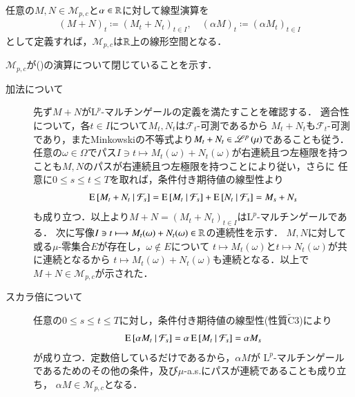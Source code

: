 	\begin{screen}
		\begin{lem}\mbox{}\\
			任意の$M,N \in \mathcal{M}_{p,c}$と$\alpha \in \mathbb{R}$に対して線型演算を
			\begin{align}
				(M + N)_t \coloneqq (M_t + N_t)_{t \in I}, 
				\quad (\alpha M)_t \coloneqq (\alpha M_t)_{t \in I}
				\label{eq:mart_linear_arithmetic_0}
			\end{align}
			として定義すれば，$\mathcal{M}_{p,c}$は$\mathbb{R}$上の線形空間となる．
		\end{lem}
	\end{screen}
	
	
	\begin{prf}
		$\mathcal{M}_{p,c}$が()の演算について閉じていることを示す．
		\begin{description}
			\item[加法について]
				先ず$M+N$が$\mathrm{L}^p$-マルチンゲールの定義を満たすことを確認する．
				適合性について，各$t \in I$について$M_t,N_t$は$\mathcal{F}_t$-可測であるから
				$M_t + N_t$も$\mathcal{F}_t$-可測であり，またMinkowskiの不等式より$M_t + N_t \in \mathscr{L}^{p} \left(\mu\right)$であることも従う．
				任意の$\omega \in \Omega$でパス$I \ni t \longmapsto M_t(\omega) + N_t(\omega)$が右連続且つ左極限を持つ
				ことも$M,N$のパスが右連続且つ左極限を持つことにより従い，さらに
				任意に$0 \leq s \leq t \leq T$を取れば，条件付き期待値の線型性より
				\begin{align}
					\operatorname{E} \left[ M_t + N_t \ \middle|\ \mathcal{F}_s \right] = \operatorname{E} \left[ M_t \ \middle|\ \mathcal{F}_s \right] + \operatorname{E} \left[ N_t \ \middle|\ \mathcal{F}_s \right] = M_s + N_s
				\end{align}
				も成り立つ．以上より$M+N = (M_t + N_t)_{t \in I}$は$\mathrm{L}^p$-マルチンゲールである．
				次に写像$I \ni t \longmapsto M_t(\omega) + N_t(\omega) \in \mathbb{R}$の連続性を示す．
				$M,N$に対して或る$\mu$-零集合$E$が存在し，$\omega \notin E$について
				$t \longmapsto M_t(\omega)$と$t \longmapsto N_t(\omega)$が共に連続となるから
				$t \longmapsto M_t(\omega) + N_t(\omega)$も連続となる．以上で$M+N \in \mathcal{M}_{p,c}$が示された．
			
			\item[スカラ倍について]
				任意の$0 \leq s \leq t \leq T$に対し，条件付き期待値の線型性(性質$\tilde{\mathrm{C}}3$)により
				\begin{align}
					\operatorname{E} \left[ \alpha M_t \ \middle|\ \mathcal{F}_s \right] = \alpha \operatorname{E} \left[ M_t \ \middle|\ \mathcal{F}_s \right] = \alpha M_s
				\end{align}
				が成り立つ．定数倍しているだけであるから，$\alpha M$が
				$\mathrm{L}^p$-マルチンゲールであるためのその他の条件，及び$\mu$-a.s.にパスが連続であることも成り立ち，
				$\alpha M \in \mathcal{M}_{p,c}$となる．
		\end{description}
		\QED
	\end{prf}
	
